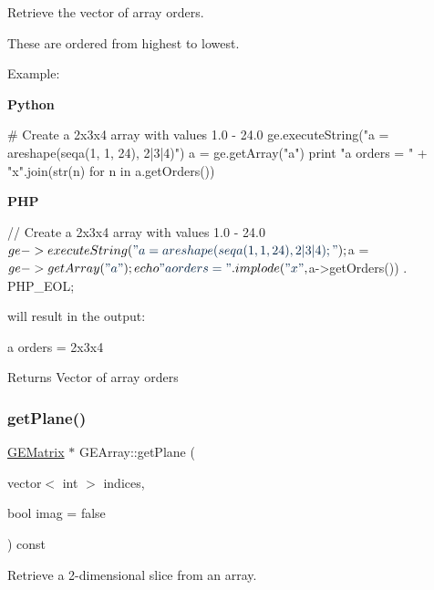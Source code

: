 Retrieve the vector of array orders. 

These are ordered from highest to lowest.

Example\+:

{\bfseries Python} 
\begin{DoxyCode}
\textcolor{comment}{# Create a 2x3x4 array with values 1.0 - 24.0}
ge.executeString(\textcolor{stringliteral}{"a = areshape(seqa(1, 1, 24), 2|3|4)"})
a = ge.getArray(\textcolor{stringliteral}{"a"})
\textcolor{keywordflow}{print} \textcolor{stringliteral}{"a orders = "} + \textcolor{stringliteral}{"x"}.join(str(n) \textcolor{keywordflow}{for} n \textcolor{keywordflow}{in} a.getOrders())
\end{DoxyCode}


{\bfseries P\+HP} 
\begin{DoxyCode}
\textcolor{comment}{// Create a 2x3x4 array with values 1.0 - 24.0}
$ge->executeString(\textcolor{stringliteral}{"a = areshape(seqa(1, 1, 24), 2|3|4);"});
$a = $ge->getArray(\textcolor{stringliteral}{"a"});
echo \textcolor{stringliteral}{"a orders = "} . implode(\textcolor{stringliteral}{"x"}, $a->getOrders()) . PHP\_EOL;
\end{DoxyCode}
 will result in the output\+: 
\begin{DoxyCode}
a orders = 2x3x4
\end{DoxyCode}


\begin{DoxyReturn}{Returns}
Vector of array orders 
\end{DoxyReturn}
\mbox{\label{class_g_e_array_ac230d6d9b825fb9a6c0dd64444268daf}} 
\subsubsection{\texorpdfstring{get\+Plane()}{getPlane()}}
{\footnotesize\ttfamily \hyperlink{class_g_e_matrix}{G\+E\+Matrix} $\ast$ G\+E\+Array\+::get\+Plane (\begin{DoxyParamCaption}\item[{vector$<$ int $>$}]{indices,  }\item[{bool}]{imag = {\ttfamily false} }\end{DoxyParamCaption}) const}



Retrieve a 2-\/dimensional slice from an array. 

